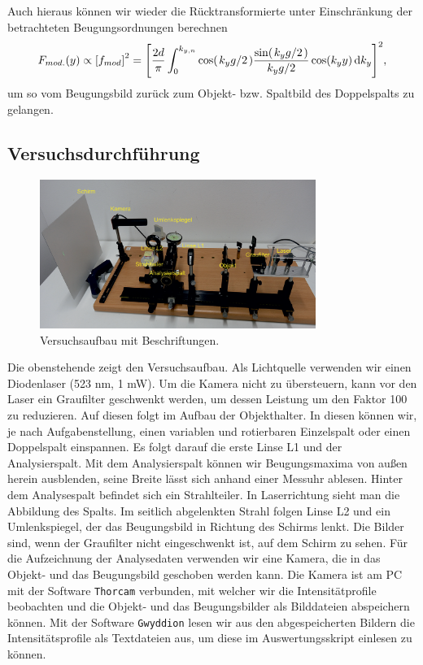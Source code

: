Auch hieraus können wir wieder die Rücktransformierte unter Einschränkung der betrachteten Beugungsordnungen berechnen
\begin{align}
  F_{mod.}(y) \propto \qty[f_{mod}]^2 = \qty[\frac{2d}{\pi} \int_0^{k_{y,n}} \cos(\ffrac{k_y g}{2}) \frac{\sin(\ffrac{k_y g}{2})}{\ffrac{k_y g}{2}} \cos(k_y y) \dd{k_y}]^2,
\end{align}
um so vom Beugungsbild zurück zum Objekt- bzw. Spaltbild des Doppelspalts zu gelangen.

\newpage
\subsection{Versuchsdurchführung}

\begin{figure}[H]
  \centering
    \includegraphics[width=0.8\textwidth]{files/versuchsaufbau_text.png}
    \caption{Versuchsaufbau mit Beschriftungen.}
    \label{fig:versuchsaufbau_text}
\end{figure}

Die obenstehende  zeigt den Versuchsaufbau. Als Lichtquelle verwenden wir einen Diodenlaser (523 nm, 1 mW). Um die Kamera nicht zu übersteuern, kann vor den Laser ein Graufilter geschwenkt werden, um dessen Leistung um den Faktor 100 zu reduzieren. Auf diesen folgt im Aufbau der Objekthalter. In diesen können wir, je nach Aufgabenstellung, einen variablen und rotierbaren Einzelspalt oder einen Doppelspalt einspannen. Es folgt darauf die erste Linse L1 und der Analysierspalt. Mit dem Analysierspalt können wir Beugungsmaxima von außen herein ausblenden, seine Breite lässt sich anhand einer Messuhr ablesen. Hinter dem Analysespalt befindet sich ein Strahlteiler. In Laser­richtung sieht man die Abbildung des Spalts. Im seitlich abgelenkten Strahl folgen Linse L2 und ein Umlenkspiegel, der das Beugungsbild in Richtung des Schirms lenkt. Die Bilder sind, wenn der Graufilter nicht eingeschwenkt ist, auf dem Schirm zu sehen. Für die Aufzeichnung der Analysedaten verwenden wir eine Kamera, die in das Objekt- und das Beugungsbild geschoben werden kann. Die Kamera ist am PC mit der Software \texttt{Thorcam} verbunden, mit welcher wir die Intensitätprofile beobachten und die Objekt- und das Beugungsbilder als Bilddateien abspeichern können. Mit der Software \texttt{Gwyddion} lesen wir aus den abgespeicherten Bildern die Intensitätsprofile als Textdateien aus, um diese im Auswertungsskript einlesen zu können. 

